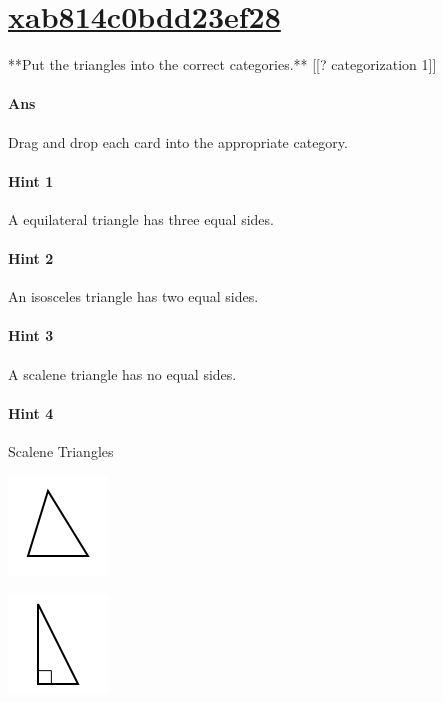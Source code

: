 \documentclass[twocolumn,10pt]{article}
\def\shrinkfactor{0.55}
\begin{document}
\section{\href{https://www.khanacademy.org/devadmin/content/items/xab814c0bdd23ef28}{xab814c0bdd23ef28}}

\noindent
**Put the triangles into the correct categories.**
[[? categorization 1]]


\paragraph{Ans} Drag and drop each card into the appropriate category. 

\paragraph{Hint 1}A equilateral triangle has three equal sides.



\paragraph{Hint 2}An isosceles triangle has two equal sides.

\paragraph{Hint 3}A scalene triangle has no equal sides.

\paragraph{Hint 4}Scalene Triangles


\includegraphics[scale=\shrinkfactor]{figures/ee7f87a00acb47dec4f2b2eed9a6741b21afc47d.png}


\includegraphics[scale=\shrinkfactor]{figures/ac56df552ee790942f862b76d637a69c2180f1d4.png}
\end{document}
